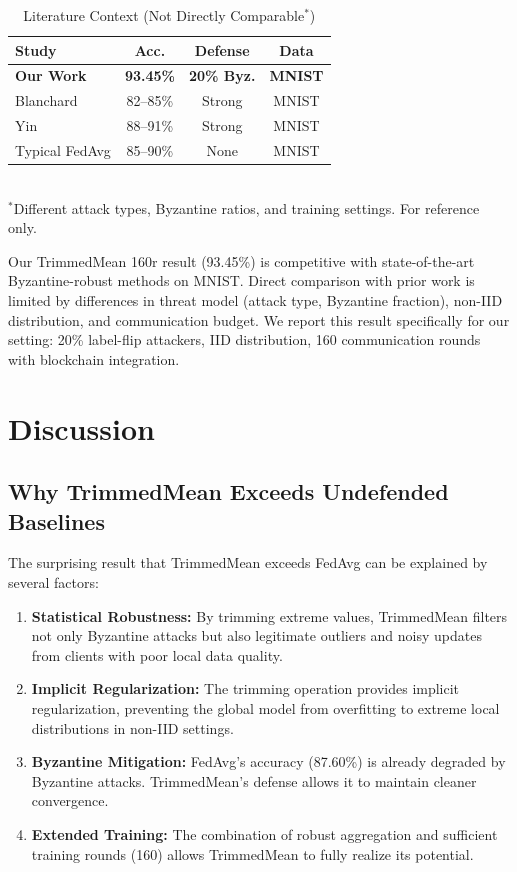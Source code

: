 \documentclass{ieeeaccess}
\begin{document}
\begin{table}[t]
\caption{Literature Context (Not Directly Comparable$^*$)}
\label{tab:literature_comparison}
\centering
{\scriptsize
\begin{tabular}{lccc}
\toprule
\textbf{Study} & \textbf{Acc.} & \textbf{Defense} & \textbf{Data} \\
\midrule
\textbf{Our Work} & \textbf{93.45\%} & \textbf{20\% Byz.} & \textbf{MNIST} \\
Blanchard~\cite{blanchard2017machine} & 82--85\% & Strong & MNIST \\
Yin~\cite{yin2018byzantine} & 88--91\% & Strong & MNIST \\
Typical FedAvg & 85--90\% & None & MNIST \\
\bottomrule
\end{tabular}
}
\\[0.05cm]
{\tiny $^*$Different attack types, Byzantine ratios, and training settings. For reference only.}
\end{table}

Our TrimmedMean 160r result (93.45\%) is competitive with state-of-the-art Byzantine-robust methods on MNIST. Direct comparison with prior work is limited by differences in threat model (attack type, Byzantine fraction), non-IID distribution, and communication budget. We report this result specifically for our setting: 20\% label-flip attackers, IID distribution, 160 communication rounds with blockchain integration.

\section{Discussion}
\label{sec:discussion}

\subsection{Why TrimmedMean Exceeds Undefended Baselines}

The surprising result that TrimmedMean exceeds FedAvg can be explained by several factors:

\begin{enumerate}
    \item \textbf{Statistical Robustness:} By trimming extreme values, TrimmedMean filters not only Byzantine attacks but also legitimate outliers and noisy updates from clients with poor local data quality.
    
    \item \textbf{Implicit Regularization:} The trimming operation provides implicit regularization, preventing the global model from overfitting to extreme local distributions in non-IID settings.
    
    \item \textbf{Byzantine Mitigation:} FedAvg's accuracy (87.60\%) is already degraded by Byzantine attacks. TrimmedMean's defense allows it to maintain cleaner convergence.
    
    \item \textbf{Extended Training:} The combination of robust aggregation and sufficient training rounds (160) allows TrimmedMean to fully realize its potential.
\end{enumerate}
\end{document}
